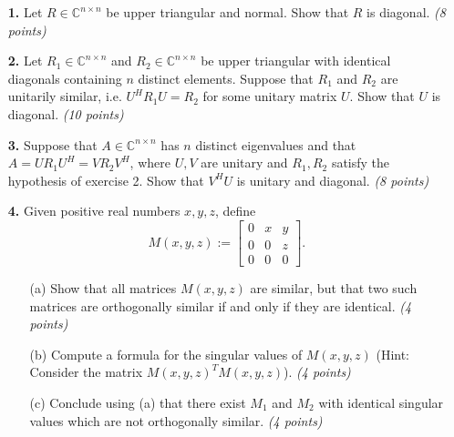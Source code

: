 \documentclass[12pt]{report}
\begin{document}
\begin{enumerate}
  \item[\textbf{1.}] Let $R\in\mathbb{C}^{n\times n}$ be upper triangular and normal. Show that $R$ is  diagonal. \textit{(8 points)}


\vspace{0.7cm}



  \item[\textbf{2.}] Let $R_1\in\mathbb{C}^{n\times n}$ and
    $R_2\in\mathbb{C}^{n\times n}$ be upper triangular with identical diagonals
    containing $n$ distinct elements. Suppose that $R_1$ and $R_2$ are 
    unitarily similar, i.e. $U^HR_1U = R_2$ for some unitary matrix $U$.
    Show that $U$ is diagonal. \textit{(10 points)}



\vspace{0.7cm}

  \item[\textbf{3.}] Suppose that $A \in \mathbb{C}^{n \times n}$ has $n$ distinct eigenvalues and
    that $A = U R_1 U^H = V R_2 V^H$, where $U,V$ are unitary and $R_1, R_2$ satisfy the hypothesis of exercise 2. Show that $V^H U$ is unitary and
    diagonal. \textit{(8 points)}


\vspace{0.7cm}


  \item[\textbf{4.}] Given positive real numbers $x,y,z$, define   \[M(x,y,z):=\left[\begin{array}{ccc}0&x&y\\0&0&z\\0&0&0\end{array}\right].\]
    \begin{enumerate}
      \item[(a)] Show that all matrices $M(x,y,z)$ are similar, but that two
         such matrices are orthogonally similar if and only if they are identical. \textit{(4 points)}

      \item[(b)] Compute a formula for the singular values of $M(x,y,z)$ (Hint: Consider the matrix $M(x,y,z)^T M(x,y,z)$). \linebreak\textit{(4 points)}
      \item[(c)] Conclude using (a) that there exist $M_1$ and $M_2$ with
        identical singular values which are not orthogonally similar. \textit{(4 points)} 
      \end{enumerate}
 

\end{enumerate}
\end{document}
